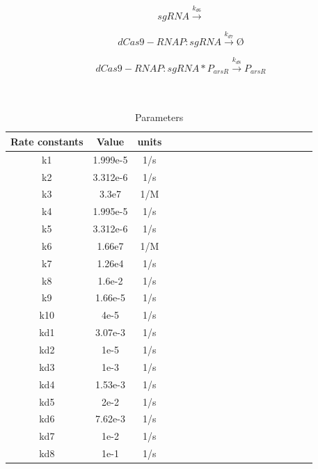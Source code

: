 \begin{equation}
sgRNA\stackrel{k_{d6}}{\longrightarrow}
\end{equation}


\begin{equation}
dCas9-RNAP:sgRNA\stackrel{k_{d7}}{\longrightarrow}Ø
\end{equation}


\begin{equation}
dCas9-RNAP:sgRNA*P_{arsR}\stackrel{k_{d8}}{\longrightarrow}P_{arsR}
\end{equation}
\\\\
\begin{table}[htbp]
	\centering
	\caption{\label {tab:test} Parameters}
	\begin{tabular}{cccccccccccccccccc}
		\toprule
		Rate constants & Value& units \\
		\midrule
		k1 & 1.999e-5 &1/s \\
		k2 & 3.312e-6 &1/s \\
		k3 & 3.3e7    & 1/M    \\
		k4 &1.995e-5 &1/s\\
		k5 & 3.312e-6 &1/s \\
		k6 &1.66e7   &1/M  \\
		k7  &1.26e4 &1/s  \\
		k8&1.6e-2& 1/s\\
		k9 &1.66e-5&1/s\\ 
		k10&4e-5&1/s\\
		kd1 & 3.07e-3&1/s\\
		kd2&1e-5&1/s\\
		kd3&1e-3&1/s\\
		kd4&1.53e-3&1/s\\
		kd5 & 2e-2&1/s\\
		kd6&7.62e-3&1/s\\
		kd7& 1e-2&1/s\\
		kd8&1e-1&1/s\\		
		\bottomrule
	\end{tabular}
\end{table}



